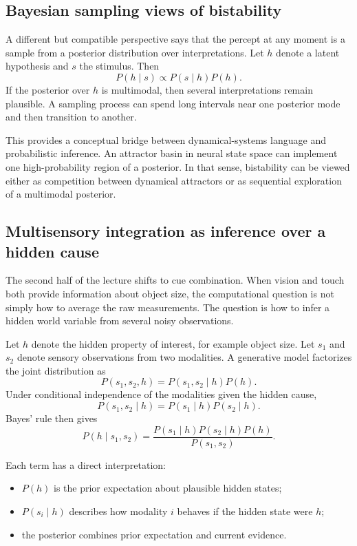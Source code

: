 \subsection{Bayesian sampling views of bistability}

A different but compatible perspective says that the percept at any moment is a sample from a posterior distribution over interpretations. Let \(h\) denote a latent hypothesis and \(s\) the stimulus. Then
\[
P(h\mid s) \propto P(s\mid h)P(h).
\]
If the posterior over \(h\) is multimodal, then several interpretations remain plausible. A sampling process can spend long intervals near one posterior mode and then transition to another.

This provides a conceptual bridge between dynamical-systems language and probabilistic inference. An attractor basin in neural state space can implement one high-probability region of a posterior. In that sense, bistability can be viewed either as competition between dynamical attractors or as sequential exploration of a multimodal posterior.

\subsection{Multisensory integration as inference over a hidden cause}

The second half of the lecture shifts to cue combination. When vision and touch both provide information about object size, the computational question is not simply how to average the raw measurements. The question is how to infer a hidden world variable from several noisy observations.

Let \(h\) denote the hidden property of interest, for example object size. Let \(s_1\) and \(s_2\) denote sensory observations from two modalities. A generative model factorizes the joint distribution as
\[
P(s_1,s_2,h)=P(s_1,s_2\mid h)P(h).
\]
Under conditional independence of the modalities given the hidden cause,
\[
P(s_1,s_2\mid h)=P(s_1\mid h)P(s_2\mid h).
\]
Bayes' rule then gives
\[
P(h\mid s_1,s_2)=\frac{P(s_1\mid h)P(s_2\mid h)P(h)}{P(s_1,s_2)}.
\]

Each term has a direct interpretation:
\begin{itemize}
    \item \(P(h)\) is the prior expectation about plausible hidden states;
    \item \(P(s_i\mid h)\) describes how modality \(i\) behaves if the hidden state were \(h\);
    \item the posterior combines prior expectation and current evidence.
\end{itemize}

